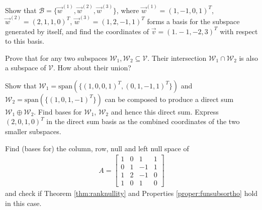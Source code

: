 \begin{Exercise}
Show that $\mathcal{B} = \{\vec{w}^{(1)}, \vec{w}^{(2)}, \vec{w}^{(3)}\}$, where $\vec{w}^{(1)} = (1,-1,0,1)^T$,
$\vec{w}^{(2)} = (2,1,1,0)^T$,
$\vec{w}^{(3)} = (1,2,-1,1)^T$ forms a basis for the subspace generated by itself, and find the coordinates of $\vec{v} = (1.-1,-2,3)^T$ with respect to this basis.
\end{Exercise}

\begin{Exercise}
Prove that for any two subspaces $\mathcal{W}_1, \mathcal{W}_2 \subseteq \mathcal{V}$. Their intersection $\mathcal{W}_1 \cap \mathcal{W}_2$ is also a subspace of $\mathcal{V}$. How about their union?
\end{Exercise}

\begin{Exercise}
Show that $\mathcal{W}_1 = \text{span}(\{(1,0,0,1)^T, (0,1,-1,1)^T\})$ and $\mathcal{W}_2 = \text{span}(\{(1,0,1,-1)^T\})$ can be composed to produce a direct sum $\mathcal{W}_1 \oplus \mathcal{W}_2$. Find bases for $\mathcal{W}_1$, $\mathcal{W}_2$ and hence this direct sum. Express $(2,0,1,0)^T$ in the direct sum basis as the combined coordinates of the two smaller subspaces.
\end{Exercise}

\begin{Exercise}
Find (bases for) the column, row, null and left null space of 
\begin{align*}
A = 
\begin{bmatrix}
1 & 0 & 1 & 1 \\
0 & 1 & -1 & 1 \\
1 & 2 & -1 & 0 \\
1 & 0 & 1 & 0
\end{bmatrix}
\end{align*}
and check if Theorem \ref{thm:ranknullity} and Properties \ref{proper:funsubsortho} hold in this case.
\end{Exercise}